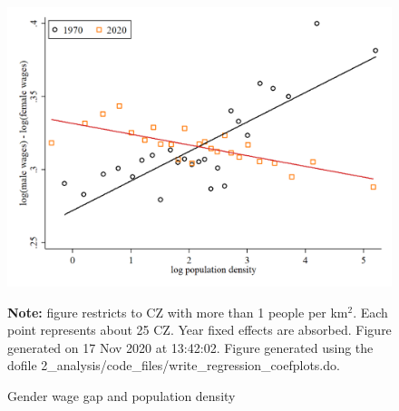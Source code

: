 \begin{figure}[!h]
\centering
\caption{Gender wage gap and population density}
\includegraphics[width=1\textwidth]{../2_analysis/output/figures/l_czone_density_1970_vs_2020}
\par \begin{minipage}[h]{\textwidth}{\tiny\textbf{Note:} figure restricts to CZ with more than 1 people per km$^2$. Each point represents about 25 CZ. Year fixed effects are absorbed. Figure generated on 17 Nov 2020 at 13:42:02. Figure generated using the dofile 2\_analysis/code\_files/write\_regression\_coefplots.do.}\end{minipage}
\end{figure}
